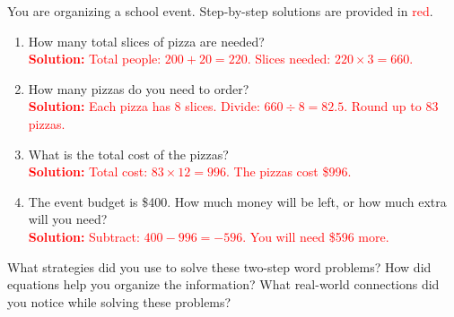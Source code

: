 \documentclass[11pt]{article}
\begin{document}
\vspace{1em}

\begin{tcolorbox}[colframe=black!60, colback=white, 
coltitle=black, colbacktitle=black!15, fonttitle=\bfseries\Large, 
title=Performance Task: Planning a School Event, halign title=center, left=10pt, right=10pt, top=10pt, bottom=50pt]
You are organizing a school event. Step-by-step solutions are provided in \textcolor{red}{red}.

\begin{enumerate}[itemsep=5em]
    \item How many total slices of pizza are needed?\\
    \textcolor{red}{\textbf{Solution:} Total people: \(200 + 20 = 220\). Slices needed: \(220 \times 3 = 660\).}
    
    \item How many pizzas do you need to order?\\
    \textcolor{red}{\textbf{Solution:} Each pizza has 8 slices. Divide: \(660 \div 8 = 82.5\). Round up to 83 pizzas.}
    
    \item What is the total cost of the pizzas?\\
    \textcolor{red}{\textbf{Solution:} Total cost: \(83 \times 12 = 996\). The pizzas cost \$996.}
    
    \item The event budget is \$400. How much money will be left, or how much extra will you need?\\
    \textcolor{red}{\textbf{Solution:} Subtract: \(400 - 996 = -596\). You will need \$596 more.}
\end{enumerate}
\end{tcolorbox}

\begin{tcolorbox}[colframe=black!60, colback=white, 
coltitle=black, colbacktitle=black!15, fonttitle=\bfseries\Large, 
title=Reflection, halign title=center, left=10pt, right=10pt, top=10pt, bottom=80pt]
What strategies did you use to solve these two-step word problems? How did equations help you organize the information? What real-world connections did you notice while solving these problems?
\end{tcolorbox}
\end{document}
